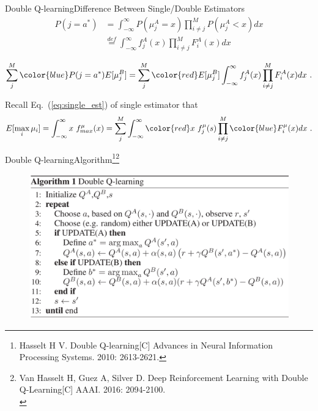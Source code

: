 \documentclass{beamer}
\newcommand{\red}[1]{{\color{red} #1}}
\newcommand{\blue}[1]{{\color{blue} #1}}
\begin{document}
\begin{frame}{Double Q-learning}{Difference Between Single/Double Estimators}
	\begin{equation}
	\begin{aligned}
		P(j=a^*) &= \int_{-\infty}^{\infty} P(\mu_j^A = x) \prod_{i\neq j}^M P(\mu_j^A <x) dx \\
		&\overset{def}{=} \int_{-\infty}^{\infty} f_j^A(x) \prod_{i\neq j}^M F_i^A(x) dx 
	\end{aligned}
	\end{equation}
	
	\begin{equation}\label{eq:double_est}
		\sum_j^M \blue{P(j=a^*)} E[\mu_j^B] = \sum_j^M \red{E[\mu_j^B]} \int_{-\infty}^{\infty} f_j^A(x) \prod_{i\neq j}^M F_i^A(x) dx ~.
	\end{equation}
	
	Recall Eq.~(\ref{eq:single_est}) of single estimator that
	\begin{equation}\nonumber
	E[\max_i \mu_i] = \int_{-\infty}^{\infty} x ~f_{max}^{\mu}(x) = \sum_j^M \int_{-\infty}^{\infty} \red{x} ~f_j^{\mu}(s) \prod_{i\neq j}^M \blue{F_i^{\mu}(x)} dx ~.
	\end{equation}
\end{frame}


\begin{frame}{Double Q-learning}{Algorithm\footnote{\tiny{Hasselt H V. Double Q-learning[C] Advances in Neural Information Processing Systems. 2010: 2613-2621.}}\footnote{\tiny{Van Hasselt H, Guez A, Silver D. Deep Reinforcement Learning with Double Q-Learning[C] AAAI. 2016: 2094-2100.}\\}}
	\begin{figure}[t]
		\includegraphics[width=0.7\columnwidth]{figures/double-q-learning-alg.jpg}
	\end{figure}
\end{frame}
\end{document}
